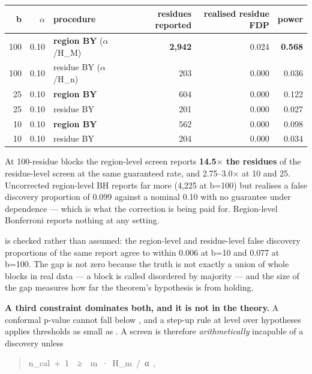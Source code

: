 \begin{center}\footnotesize
\begin{tabular}{rrlrrr}
\toprule
\textbf{b} & \textbf{$\alpha$} & \textbf{procedure} & \textbf{residues reported} & \textbf{realised residue FDP} & \textbf{power} \\
\midrule
100 & 0.10 & \textbf{region BY} ($\alpha$/H\_M) & \textbf{2,942} & 0.024 & \textbf{0.568} \\
100 & 0.10 & residue BY ($\alpha$/H\_n) & 203 & 0.000 & 0.036 \\
25 & 0.10 & \textbf{region BY} & 604 & 0.000 & 0.122 \\
25 & 0.10 & residue BY & 201 & 0.000 & 0.027 \\
10 & 0.10 & \textbf{region BY} & 562 & 0.000 & 0.098 \\
10 & 0.10 & residue BY & 204 & 0.000 & 0.034 \\
\bottomrule
\end{tabular}
\end{center}

At 100-residue blocks the region-level screen reports \textbf{14.5$\times$ the residues} of
the residue-level screen at the same guaranteed rate, and 2.75--3.0$\times$ at 10 and 25.
Uncorrected region-level BH reports far more (4,225 at b=100) but realises a
false discovery proportion of 0.099 against a nominal 0.10 with no guarantee
under dependence --- which is what the correction is being paid for.
Region-level Bonferroni reports nothing at any setting.

 is checked rather than assumed: the region-level and residue-level
false discovery proportions of the same report agree to within 0.006 at b=10 and
0.077 at b=100. The gap is not zero because the truth is not exactly a union of
whole blocks in real data --- a block is called disordered by majority --- and the
size of the gap measures how far the theorem's hypothesis is from holding.

\textbf{A third constraint dominates both, and it is not in the theory.} A conformal
p-value cannot fall below , and a step-up rule at level 
over  hypotheses applies thresholds as small as . A screen is
therefore \emph{arithmetically} incapable of a discovery unless

\begin{quote}\ttfamily\footnotesize\begin{flushleft}
n\_cal~+~1~~≥~~m~·~H\_m~/~α~,\\
\end{flushleft}\end{quote}

